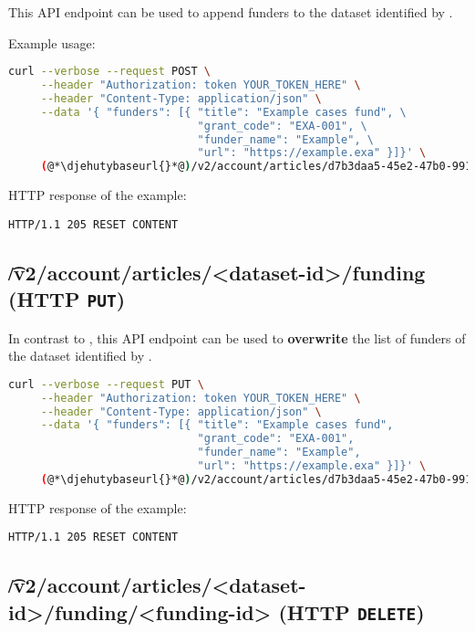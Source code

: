   This API endpoint can be used to append funders to the dataset identified
  by .

  Example usage:
\begin{lstlisting}[language=bash]
curl --verbose --request POST \
     --header "Authorization: token YOUR_TOKEN_HERE" \
     --header "Content-Type: application/json" \
     --data '{ "funders": [{ "title": "Example cases fund", \
                             "grant_code": "EXA-001", \
                             "funder_name": "Example", \
                             "url": "https://example.exa" }]}' \
     (@*\djehutybaseurl{}*@)/v2/account/articles/d7b3daa5-45e2-47b0-9910-0f7fa6a995b1/funding
\end{lstlisting}

  HTTP response of the example:
\begin{lstlisting}
HTTP/1.1 205 RESET CONTENT
\end{lstlisting}

\subsection{\t{/v2/account/articles/<dataset-id>/funding} (HTTP \texttt{PUT})}

  In contrast to , this API endpoint
  can be used to \textbf{overwrite} the list of funders of the dataset
  identified by .

\begin{lstlisting}[language=bash]
curl --verbose --request PUT \
     --header "Authorization: token YOUR_TOKEN_HERE" \
     --header "Content-Type: application/json" \
     --data '{ "funders": [{ "title": "Example cases fund",
                             "grant_code": "EXA-001",
                             "funder_name": "Example",
                             "url": "https://example.exa" }]}' \
     (@*\djehutybaseurl{}*@)/v2/account/articles/d7b3daa5-45e2-47b0-9910-0f7fa6a995b1/funding
\end{lstlisting}

  HTTP response of the example:
\begin{lstlisting}
HTTP/1.1 205 RESET CONTENT
\end{lstlisting}

\subsection{\t{/v2/account/articles/<dataset-id>/funding/<funding-id>} (HTTP \texttt{DELETE})}

